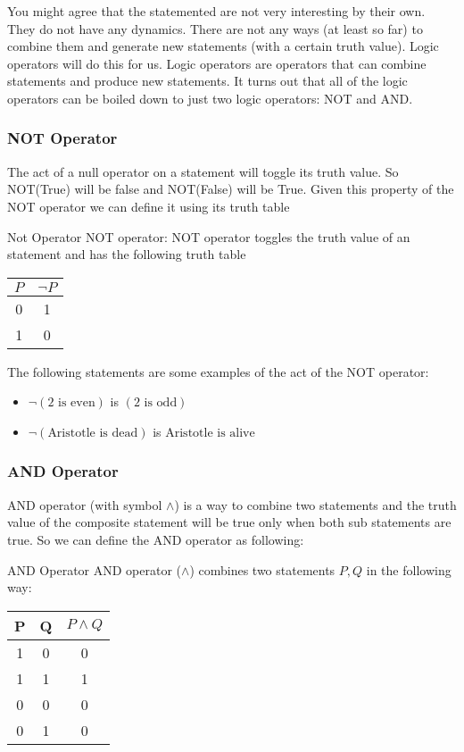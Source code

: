 You might agree that the statemented are not very interesting by their own. They do not have any dynamics. There are not any ways (at least so far) to combine them and generate new statements (with a certain truth value). Logic operators will do this for us. Logic operators are operators that can combine statements and produce new statements. It turns out that all of the logic operators can be boiled down to just two logic operators: NOT and AND.

\subsubsection{NOT Operator}
The act of a null operator on a statement will toggle its truth value. So NOT(True) will be false and NOT(False) will be True. Given this property of the NOT operator we can define it using its truth table

\begin{defbox}{Not Operator}
	NOT operator: NOT operator toggles the truth value of an statement and has the following truth table
	\begin{center}
		\begin{tabular}{|c|c|}
		\hline
		$ P $ & $ \neg P $ \\
		\hline
		0 & 1 \\
		\hline
		1 & 0 \\
		\hline
		\end{tabular}
	\end{center}
\end{defbox}

The following statements are some examples of the act of the NOT operator:

\begin{itemize}
	\item $ \neg (\text{2 is even} )$ is $ (\text{2 is odd}) $
	\item $ \neg (\text{Aristotle is dead}) $ is $ \text{Aristotle is alive} $
\end{itemize}


\subsubsection{AND Operator}
AND operator (with symbol $ \wedge $) is a way to combine two statements and the truth value of the composite statement will be true only when both sub statements are true. So we can define the AND operator as following:

\begin{defbox}{AND Operator}
	AND operator ($ \wedge $) combines two statements $ P, Q $ in the following way:
	\begin{center}
		\begin{tabular}{|c|c|c|}
			\hline
			P & Q & $ P \wedge Q $ \\
			\hline
			1 & 0 & 0 \\
			\hline
			1 & 1 & 1 \\
			\hline
			0 & 0 & 0 \\
			\hline
			0 & 1 & 0 \\
			\hline
		\end{tabular}
	\end{center}
\end{defbox}

